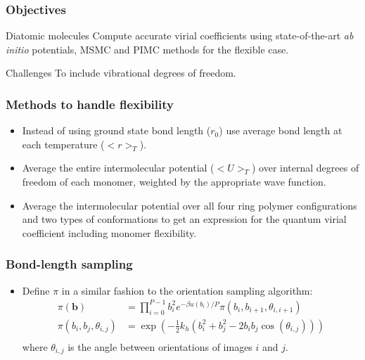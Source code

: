 \documentclass[xcolor=svgnames]{beamer}
\DeclareRobustCommand{\abinitio}[0]{\emph{ab initio}}
\begin{document}
        \begin{frame}
            \frametitle{Objectives}
            \begin{block}{Diatomic molecules}
                Compute accurate virial coefficients using state-of-the-art \abinitio{} potentials, MSMC and PIMC methods for the flexible case.
            \end{block}
                \begin{alertblock}{Challenges}
                    To include vibrational degrees of freedom.
                \end{alertblock}
        \end{frame}
        \begin{frame}
            \frametitle{Methods to handle flexibility}
            \begin{itemize}
                \justifying
                \item Instead of using ground state bond length ($r_0$) use average bond length at each temperature ($< r >_T$).
                \item Average the entire intermolecular potential ($<U>_T$) over internal degrees of freedom of each monomer, weighted by the appropriate wave function.
                \item Average the intermolecular potential over all four ring polymer configurations and two types of conformations to get an expression for the quantum virial coefficient including monomer flexibility.
            \end{itemize}
        \end{frame}
        \begin{frame}
            \frametitle{Bond-length sampling}
            \begin{itemize}
                \item Define $\pi$ in a similar fashion to the orientation sampling algorithm:
                \begin{equation*}
                    \begin{aligned}
                        \pi(\mathbf{b}) &= \displaystyle\prod\limits_{i=0}^{P-1} b_i^2 e^{-\beta u(b_i)/P} \pi(b_i,b_{i+1},\theta_{i,i+1}) \\
                        \pi(b_i,b_j,\theta_{i,j}) &= \exp\left(-\frac{1}{2}  k_h  \left( b_i^2 + b_j^2 - 2  b_i  b_j  \cos (\theta_{i,j}) \right)\right)\\
                    \end{aligned}
                \end{equation*}
                where $\theta_{i,j}$ is the angle between orientations of images $i$ and $j$.
            \end{itemize}
        \end{frame}
\end{document}
